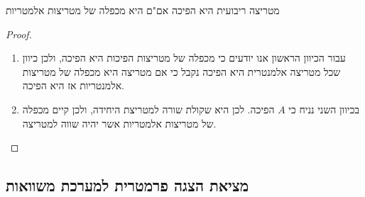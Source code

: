 \documentclass{tstextbook}
\begin{document}
\begin{proposition}
מטריצה ריבועית היא הפיכה אם"ם היא מכפלה של מטריצות אלמטריות

\end{proposition}
\begin{proof}
  \begin{enumerate}
    \item עבור הכיוון הראשון אנו יודעים כי מכפלה של מטריצות הפיכות היא הפיכה, ולכן כיוון שכל מטריצה אלמנטרית היא הפיכה נקבל כי אם מטריצה היא מכפלה של מטריצות אלמנטריות אז היא הפיכה. 


    \item בכיוון השני נניח כי \(A\) הפיכה. לכן היא שקולת שורה למטריצת היחידה, ולכן קיים מכפלה של מטריצות אלמטריות אשר יהיה שווה למטריצה. 


  \end{enumerate}
\end{proof}
\subsection{מציאת הצגה פרמטרית למערכת משוואות}
\end{document}
